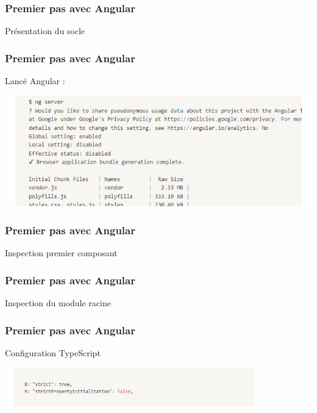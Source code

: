 \documentclass[10pt]{beamer}
\begin{document}
	\begin{frame}
		\frametitle{Premier pas avec Angular}

		\centering
		Présentation du socle \newline \newline

	\end{frame}

	\begin{frame}
		\frametitle{Premier pas avec Angular}

		Lancé Angular : \newline \newline

		\centering
		\includegraphics[width=15cm]{assets/ngserve} \newline

	\end{frame}

	\begin{frame}
		\frametitle{Premier pas avec Angular}

		\centering
		Inspection premier composant \newline \newline

	\end{frame}

	\begin{frame}
		\frametitle{Premier pas avec Angular}

		\centering
		Inspection du module racine \newline \newline

	\end{frame}

	\begin{frame}
		\frametitle{Premier pas avec Angular}

		\centering
		Configuration TypeScript \newline \newline


		\centering
		\includegraphics[width=11cm]{assets/tsConfig} \newline

	\end{frame}
\end{document}
